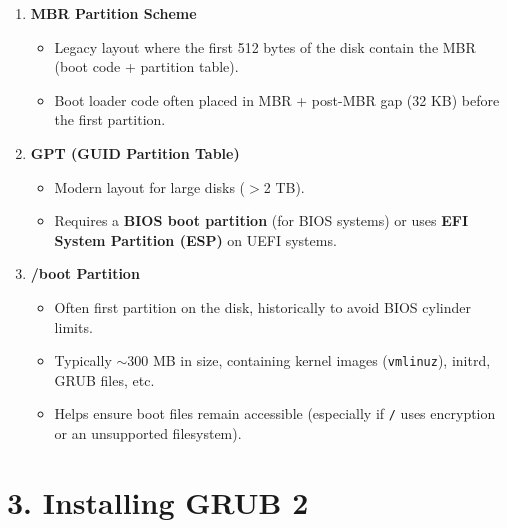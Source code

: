 \documentclass[a4paper]{report}
\begin{document}
\begin{enumerate}
    \item \textbf{MBR Partition Scheme}
    \begin{itemize}
        \item Legacy layout where the first 512 bytes of the disk contain the MBR (boot code + partition table).
        \item Boot loader code often placed in MBR + post-MBR gap (32 KB) before the first partition.
    \end{itemize}

    \item \textbf{GPT (GUID Partition Table)}
    \begin{itemize}
        \item Modern layout for large disks ($>$2 TB).
        \item Requires a \textbf{BIOS boot partition} (for BIOS systems) or uses \textbf{EFI System Partition (ESP)} on UEFI systems.
    \end{itemize}

    \item \textbf{/boot Partition}
    \begin{itemize}
        \item Often first partition on the disk, historically to avoid BIOS cylinder limits.
        \item Typically $\sim$300 MB in size, containing kernel images (\texttt{vmlinuz}), initrd, GRUB files, etc.
        \item Helps ensure boot files remain accessible (especially if \texttt{/} uses encryption or an unsupported filesystem).
    \end{itemize}
\end{enumerate}

\section*{3. Installing GRUB 2}
\end{document}
